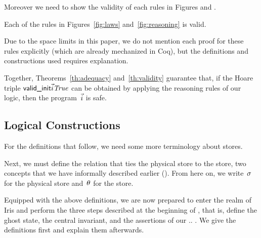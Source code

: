 Moreover we need to show the validity of each rules in Figures  and .
\begin{theorem}
\label{th:validity}
  Each of the rules in Figures~\ref{fig:laws}
  and~\ref{fig:reasoning} is valid.
\end{theorem}
Due to the space limits in this paper, we do not mention each proof for these rules explicitly (which are already mechanized in Coq),
but the definitions and constructions used requires explanation.

Together, Theorems~\ref{th:adequacy} and~\ref{th:validity} guarantee that, if
the Hoare triple $\textsf{valid\_init}\vec{i}\mathit{True}$ can be obtained by applying
the reasoning rules of our logic, then the program~$\vec{i}$ is safe.

\subsection{Logical Constructions}
\label{sec:invariant}

For the definitions that follow, we need some more terminology about stores.

Next, we must define the relation that ties the physical store to the
\logical store, two concepts that we have informally described earlier
(). From here on, we write~$\sigma$ for the physical
store and~$\theta$ for the \logical store.

Equipped with the above definitions, we are now prepared to enter the realm of
Iris and perform the three steps described at the beginning of
, that is, define the ghost state, the central invariant,
and the assertions of our .. . We give the definitions first and explain them
afterwards.

